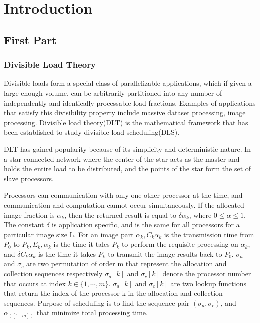 \documentclass[twocolumn]{article}
\begin{document}
\section{Introduction}
\subsection{First Part}
\subsubsection{Divisible Load Theory}
Divisible loads form a special class of parallelizable applications, which if given a large enough volume, can be arbitrarily partitioned into any number of independently and identically processable load fractions. Examples of applications that satisfy this divisibility property include massive dataset processing, image processing. Divisible load theory(DLT) is the mathematical framework that has been established to study divisible load scheduling(DLS).

DLT has gained popularity because of its simplicity and deterministic nature. In a star connected network where the center of the star acts as the master and holds the entire load to be distributed, and the points of the star form the set of slave processors.

Processors can communication with only one other processor at the time, and communication and computation cannot occur simultaneously. If the allocated image fraction is $\alpha_k$, then the returned result is equal to $\delta\alpha_k$, where $0\le\alpha\le 1$. The constant $\delta$ is application specific, and is the same for all processors for a particular image size L. For an image part $\alpha_k, C_k \alpha_k$ is the transmission time from $P_0$ to $P_k, E_k, \alpha_k$ is the time it tales $P_k$ to perform the requisite processing on $\alpha_k$, and $\delta C_k \alpha_k$ is the time it takes $P_k$ to transmit the image results back to $P_0$.
  $\sigma_a$ and $\sigma_c$ are two permutation of order m that represent the allocation and collection sequences respectively $\sigma_a [k]$ and $\sigma_c [k]$ denote the processor number that occurs at index $k\in\{1,⋯,m\}$. $\sigma_a [k]$ and $\sigma_c [k]$ are two lookup functions that return the index of the processor k in the allocation and collection sequences. Purpose of scheduling is to find the sequence pair $(\sigma_a, \sigma_c)$, and $\alpha_([1⋯m])$ that minimize total processing time.
\end{document}
